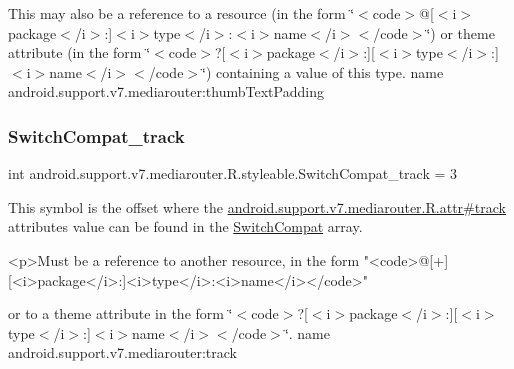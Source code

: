This may also be a reference to a resource (in the form \char`\"{}$<$code$>$@\mbox{[}$<$i$>$package$<$/i$>$\+:\mbox{]}$<$i$>$type$<$/i$>$\+:$<$i$>$name$<$/i$>$$<$/code$>$\char`\"{}) or theme attribute (in the form \char`\"{}$<$code$>$?\mbox{[}$<$i$>$package$<$/i$>$\+:\mbox{]}\mbox{[}$<$i$>$type$<$/i$>$\+:\mbox{]}$<$i$>$name$<$/i$>$$<$/code$>$\char`\"{}) containing a value of this type.  name android.\+support.\+v7.\+mediarouter\+:thumb\+Text\+Padding \mbox{\label{classandroid_1_1support_1_1v7_1_1mediarouter_1_1R_1_1styleable_a7d3a42dee16a25712492d2908119800b}} 
\subsubsection{\texorpdfstring{Switch\+Compat\+\_\+track}{SwitchCompat\_track}}
{\footnotesize\ttfamily int android.\+support.\+v7.\+mediarouter.\+R.\+styleable.\+Switch\+Compat\+\_\+track = 3\hspace{0.3cm}{\ttfamily [static]}}

This symbol is the offset where the \hyperlink{classandroid_1_1support_1_1v7_1_1mediarouter_1_1R_1_1attr_a13264085643a0ef36c13712084481c13}{android.\+support.\+v7.\+mediarouter.\+R.\+attr\#track} attribute\textquotesingle{}s value can be found in the \hyperlink{classandroid_1_1support_1_1v7_1_1mediarouter_1_1R_1_1styleable_af5c7f83276b6c88619833dc8bebeacd9}{Switch\+Compat} array.

\begin{DoxyVerb}      <p>Must be a reference to another resource, in the form "<code>@[+][<i>package</i>:]<i>type</i>:<i>name</i></code>"
\end{DoxyVerb}
 or to a theme attribute in the form \char`\"{}$<$code$>$?\mbox{[}$<$i$>$package$<$/i$>$\+:\mbox{]}\mbox{[}$<$i$>$type$<$/i$>$\+:\mbox{]}$<$i$>$name$<$/i$>$$<$/code$>$\char`\"{}.  name android.\+support.\+v7.\+mediarouter\+:track \mbox{\label{classandroid_1_1support_1_1v7_1_1mediarouter_1_1R_1_1styleable_a42bb997a8b3e8b983afbbea7a8ee301a}} 
